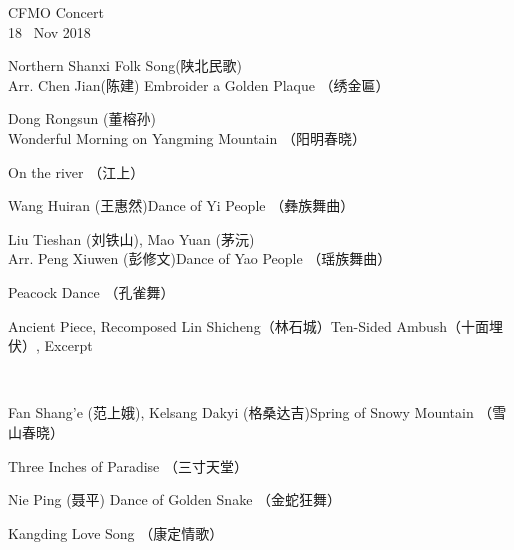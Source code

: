 \documentclass[letter,6pt,poets]{ConcProg}
\begin{document}
\begin{programme}{
    CFMO Concert
\\  {\normalsize 18 ~Nov 2018}
}
\begin{part}[]
    \begin{composition}{Northern Shanxi Folk Song(陕北民歌)\\Arr. Chen Jian(陈建)} {}{Embroider a Golden Plaque  （绣金匾）}{}
    \end{composition}
    \begin{composition}{Dong Rongsun (董榕孙)} {}{Wonderful Morning on Yangming Mountain  （阳明春晓）
}{}
    \end{composition}
    \begin{composition}{} {}{On the river （江上）}{}
    \end{composition}
    \begin{composition}{Wang Huiran (王惠然)}{}{Dance of Yi People  （彝族舞曲）}{}
                   {}{}
    \end{composition}
    \begin{composition}{Liu Tieshan (刘铁山), Mao Yuan (茅沅) \\Arr. Peng Xiuwen (彭修文)}{}{Dance of Yao People  （瑶族舞曲）}{}
    \end{composition}
    \begin{composition}{}{}{Peacock Dance （孔雀舞） }{}
    \end{composition}
    \begin{composition}{Ancient Piece, Recomposed Lin Shicheng（林石城）}{}{Ten-Sided Ambush（十面埋伏）, Excerpt}{}
    \end{composition}\\
    \begin{composition}{Fan Shang'e (范上娥), Kelsang Dakyi (格桑达吉)}{}{Spring of Snowy Mountain   （雪山春晓）}{}
                   {}{}
    \end{composition}
    \begin{composition}{}{}{Three Inches of Paradise  （三寸天堂）}{}
    \end{composition}
    \begin{composition}{Nie Ping (聂平)} {}{Dance of Golden Snake  （金蛇狂舞）}{}
    \end{composition}
    \begin{composition}{}{}{Kangding Love Song  （康定情歌）}{}

\end{composition}
\end{part}
\end{programme}
\end{document}
